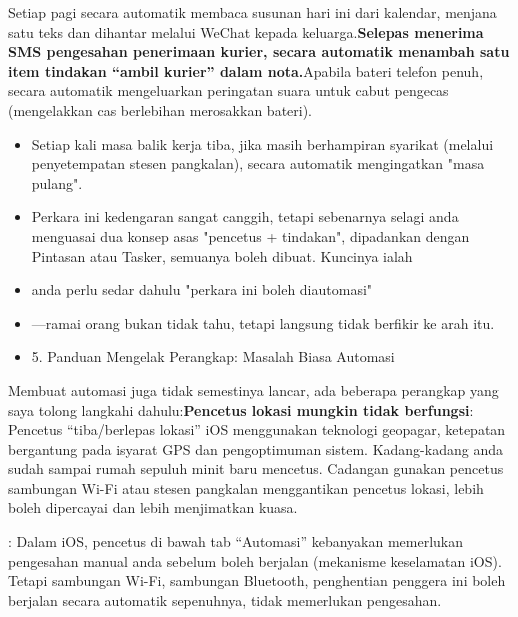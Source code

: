 
Setiap pagi secara automatik membaca susunan hari ini dari kalendar, menjana satu teks dan dihantar melalui WeChat kepada keluarga.\textbf{Selepas menerima SMS pengesahan penerimaan kurier, secara automatik menambah satu item tindakan “ambil kurier” dalam nota.}Apabila bateri telefon penuh, secara automatik mengeluarkan peringatan suara untuk cabut pengecas (mengelakkan cas berlebihan merosakkan bateri).

\begin{itemize}
  \item Setiap kali masa balik kerja tiba, jika masih berhampiran syarikat (melalui penyetempatan stesen pangkalan), secara automatik mengingatkan "masa pulang".
  \item Perkara ini kedengaran sangat canggih, tetapi sebenarnya selagi anda menguasai dua konsep asas "pencetus + tindakan", dipadankan dengan Pintasan atau Tasker, semuanya boleh dibuat. Kuncinya ialah
  \item anda perlu sedar dahulu "perkara ini boleh diautomasi"
  \item —ramai orang bukan tidak tahu, tetapi langsung tidak berfikir ke arah itu.
  \item 5. Panduan Mengelak Perangkap: Masalah Biasa Automasi
\end{itemize}

Membuat automasi juga tidak semestinya lancar, ada beberapa perangkap yang saya tolong langkahi dahulu:\textbf{Pencetus lokasi mungkin tidak berfungsi}: Pencetus “tiba/berlepas lokasi” iOS menggunakan teknologi geopagar, ketepatan bergantung pada isyarat GPS dan pengoptimuman sistem. Kadang-kadang anda sudah sampai rumah sepuluh minit baru mencetus. Cadangan gunakan pencetus sambungan Wi-Fi atau stesen pangkalan menggantikan pencetus lokasi, lebih boleh dipercayai dan lebih menjimatkan kuasa.


: Dalam iOS, pencetus di bawah tab “Automasi” kebanyakan memerlukan pengesahan manual anda sebelum boleh berjalan (mekanisme keselamatan iOS). Tetapi sambungan Wi-Fi, sambungan Bluetooth, penghentian penggera ini boleh berjalan secara automatik sepenuhnya, tidak memerlukan pengesahan.


